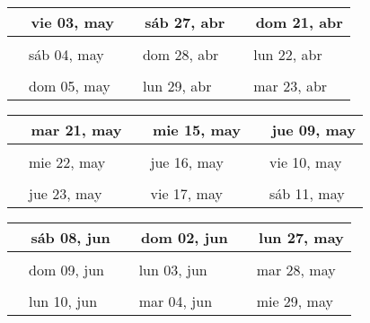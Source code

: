 \documentclass[letterpaper,10pt]{article}
\begin{document}
\begin{tabular}{lll}
\\
{\ \ vie 03, may\hspace{4.5cm}\vspace{2.25cm}} &{\ \ sáb 27, abr\hspace{4.5cm}} &{\ \ dom 21, abr\hspace{4.5cm}}
\\ \hline \\
{\ \ sáb 04, may\vspace{2.25cm}} & {\ \ dom 28, abr} & {\ \ lun 22, abr}
\\ \hline \\
{\ \ dom 05, may\vspace{2.25cm}} & {\ \ lun 29, abr} & {\ \ mar 23, abr}
\\
\end{tabular}\par
\begin{tabular}{lll}
\\
{\ \ mar 21, may\hspace{4.5cm}\vspace{2.25cm}} &{\ \ mie 15, may\hspace{4.5cm}} &{\ \ jue 09, may\hspace{4.5cm}}
\\ \hline \\
{\ \ mie 22, may\vspace{2.25cm}} & {\ \ jue 16, may} & {\ \ vie 10, may}
\\ \hline \\
{\ \ jue 23, may\vspace{2.25cm}} & {\ \ vie 17, may} & {\ \ sáb 11, may}
\\
\end{tabular}\par
\begin{tabular}{lll}
\\
{\ \ sáb 08, jun\hspace{4.5cm}\vspace{2.25cm}} &{\ \ dom 02, jun\hspace{4.5cm}} &{\ \ lun 27, may\hspace{4.5cm}}
\\ \hline \\
{\ \ dom 09, jun\vspace{2.25cm}} & {\ \ lun 03, jun} & {\ \ mar 28, may}
\\ \hline \\
{\ \ lun 10, jun\vspace{2.25cm}} & {\ \ mar 04, jun} & {\ \ mie 29, may}
\\
\end{tabular}\par
\end{document}
